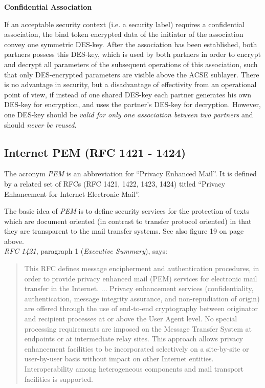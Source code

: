 {\bf Confidential Association}
\label{isw-ca}

If an acceptable security context (i.e. a security label)
requires a confidential association,
the bind token encrypted data of the initiator of the association
convey one symmetric DES-key.
After the association has been established,
both partners possess this DES-key,
which is used by both partners in order to
encrypt and decrypt all parameters of the subsequent operations
of this association, such that only DES-encrypted
parameters are visible above the ACSE sublayer.
There is no advantage in security, but a disadvantage of
effectivity from an operational point of view,
if instead of one shared DES-key each partner generates
his own DES-key for encryption, and uses the partner's DES-key for decryption.
However, one DES-key should be {\em valid for only one association
between two partners} and should {\em never be reused}.


\subsection{Internet PEM (RFC 1421 - 1424)}
The acronym {\em PEM} is an abbreviation for
``Privacy Enhanced Mail''.
It is defined by a
related set of RFCs
(RFC 1421, 1422, 1423, 1424)
titled ``Privacy Enhancement for Internet Electronic Mail''.

The basic idea of {\em PEM} is to define security services
for the protection of texts
which are document oriented (in contrast to transfer protocol oriented)
in that they are transparent to the mail transfer systems.
See also figure 19 on page \pageref{fig-isw-mhs-3} above. \\
{\em RFC 1421}, paragraph 1 ({\em Executive Summary}), says:

\begin{quote}
This RFC defines message encipherment and authentication
procedures, in order to provide privacy enhanced mail (PEM)
services for electronic mail transfer in the Internet.
$\ldots$
Privacy enhancement services (confidentiality, authentication,
message integrity assurance, and non-repudiation of origin)
are offered through the use of
end-to-end cryptography between originator and recipient
processes at or above the User Agent level.
No special processing requirements are imposed on the
Message Transfer System at endpoints or at intermediate relay sites.
This approach allows privacy enhancement facilities to be incorporated
selectively on a site-by-site or user-by-user basis without impact
on other Internet entities.
Interoperability among heterogeneous components and mail transport
facilities is supported.
\end{quote}


